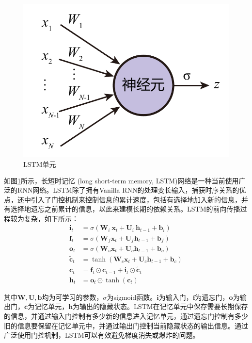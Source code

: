 \begin{figure}[]
    \centering
    \includegraphics[page=4,width=\linewidth]{figure/figures.pdf}
    \caption{LSTM单元}
    \label{lstm}
\end{figure}

如图\ref{lstm}所示，长短时记忆 (long short-term memory, LSTM)\cite{lstm97}网络是一种当前使用广泛的RNN网络。LSTM除了拥有Vanilla RNN的处理变长输入，捕获时序关系的优点，还中引入了门控机制来控制信息的累计速度，包括有选择地加入新的信息，并有选择地遗忘之前累计的信息，以此来建模长期的依赖关系。LSTM的前向传播过程较为复杂，如下所示：
\begin{align}
\bm{i}_t&=\sigma\left(\bm{W}_i\ \bm{x}_t+\bm{U}_i\ \bm{h}_{t-1}+\bm{b}_i\right)\\
\bm{f}_t&=\sigma\left(\bm{W}_f\bm{x}_t+\bm{U}_f\bm{h}_{t-1}+\bm{b}_f\right)\\
\bm{o}_t&=\sigma\left(\bm{W}_o\bm{x}_t+\bm{U}_o\bm{h}_{t-1}+\bm{b}_o\right)\\
{\widetilde{\bm{c}}}_t&=\tanh{\left(\bm{W}_c\bm{x}_t+\bm{U}_c\bm{h}_{t-1}+\bm{b}_c\right)}\\
\bm{c}_t&=\bm{f}_t\odot\bm{c}_{t-1}+\bm{i}_t\odot{\widetilde{\bm{c}}}_t\\
\bm{h}_t&=\bm{o}_t\odot\tanh{\left(\bm{c}_t\right)}
\end{align}

其中$\bm{W},\bm{U},\bm{b}$均为可学习的参数，$\sigma$为sigmoid函数。$\bm{i}$为输入门，$\bm{f}$为遗忘门，$\bm{o}$为输出门，$\bm{c}$为记忆单元，$\bm{h}$为输出的隐藏状态。LSTM在记忆单元中保存需要长期保存的信息，并通过输入门控制有多少新的信息进入记忆单元，通过遗忘门控制有多少旧的信息要保留在记忆单元中，并通过输出门控制当前隐藏状态的输出信息。通过广泛使用门控机制，LSTM可以有效避免梯度消失或爆炸的问题。

